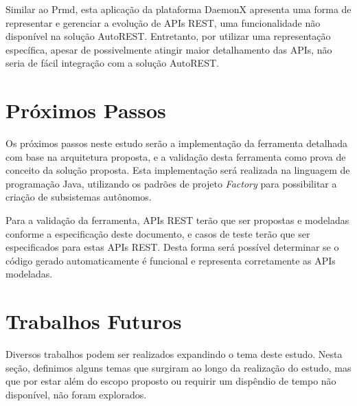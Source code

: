 Similar ao Prmd, esta aplicação da plataforma DaemonX apresenta uma forma de representar e gerenciar a evolução de APIs REST, uma funcionalidade não disponível na solução AutoREST. Entretanto, por utilizar uma representação específica, apesar de possivelmente atingir maior detalhamento das APIs, não seria de fácil integração com a solução AutoREST.


\section{Próximos Passos}

Os próximos passos neste estudo serão a implementação da ferramenta detalhada com base na arquitetura proposta, e a validação desta ferramenta como prova de conceito da solução proposta. Esta implementação será realizada na linguagem de programação Java, utilizando os padrões de projeto \textit{Factory} para possibilitar a criação de subsistemas autônomos.

Para a validação da ferramenta, APIs REST terão que ser propostas e modeladas conforme a especificação deste documento, e casos de teste terão que ser especificados para estas APIs REST. Desta forma será possível determinar se o código gerado automaticamente é funcional e representa corretamente as APIs modeladas.


\section{Trabalhos Futuros}

Diversos trabalhos podem ser realizados expandindo o tema deste estudo. Nesta seção, definimos alguns temas que surgiram ao longo da realização do estudo, mas que por estar além do escopo proposto ou requirir um dispêndio de tempo não disponível, não foram explorados.

